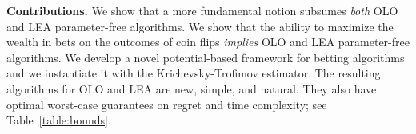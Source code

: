

\textbf{Contributions.} We show that a more fundamental notion subsumes
\emph{both} \ac{OLO} and \ac{LEA} parameter-free algorithms. We show that the
ability to maximize the wealth in bets on the outcomes of coin flips
\emph{implies} \ac{OLO} and \ac{LEA} parameter-free algorithms. We develop a
novel potential-based framework for betting algorithms and we instantiate it
with the Krichevsky-Trofimov estimator.  The resulting algorithms for \ac{OLO}
and \ac{LEA} are new, simple, and natural.  They also have optimal worst-case
guarantees on regret and time complexity; see Table~\ref{table:bounds}.
